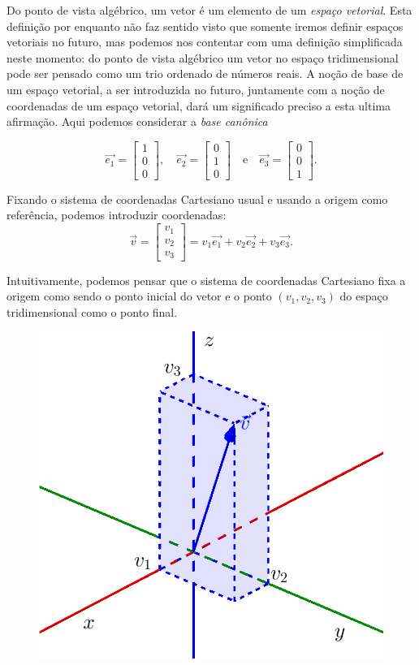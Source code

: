 Do ponto de vista algébrico, um vetor é um elemento de um {\it espaço vetorial}. Esta definição por enquanto não faz sentido visto que somente iremos definir espaços vetoriais no futuro, mas podemos nos contentar com uma definição simplificada neste momento: do ponto de vista algébrico um vetor no espaço tridimensional pode ser pensado como um trio ordenado de números reais. A noção de base de um espaço vetorial, a ser introduzida no futuro, juntamente com a noção de coordenadas de um espaço vetorial, dará um significado preciso a esta ultima afirmação. Aqui podemos considerar a {\it base canônica} 

\begin{equation}
\vec{e_1} =
\left[
\begin{array}{c}
1 \\
0 \\
0
\end{array}
\right], \quad
\vec{e_2} =
\left[
\begin{array}{c}
0 \\
1 \\
0
\end{array}
\right] \quad  \text{e} \quad
\vec{e_3} =
\left[
\begin{array}{c}
0 \\
0 \\
1
\end{array}
\right].
\end{equation} 


Fixando o sistema de coordenadas Cartesiano usual e usando a origem como referência, podemos introduzir coordenadas:
\begin{equation}
\vec{v} =
\left[
  \begin{array}{c}
    v_1 \\
    v_2 \\
    v_3
  \end{array}
\right]
= v_1 \vec{e_1} + v_2 \vec{e_2} + v_3 \vec{e_3}.
\end{equation} 



\noindent Intuitivamente, podemos pensar que o sistema de coordenadas Cartesiano fixa a origem como sendo o ponto inicial do vetor e o ponto $(v_1, v_2, v_3)$ do espaço tridimensional como o ponto final. 

\begin{figure}[h!]
\begin{center}
\includegraphics[width=0.2\linewidth]{Semana02/semana02-coord}
\end{center}
\end{figure}


